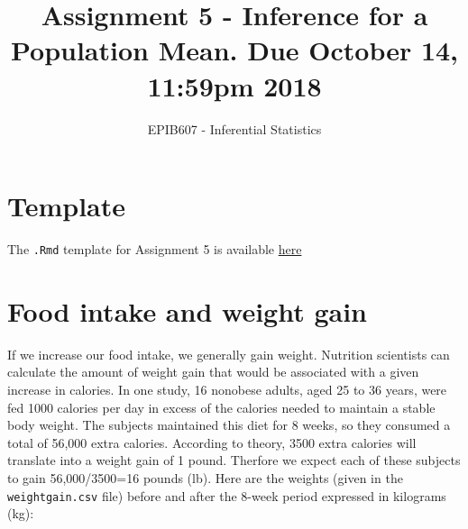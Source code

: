 \documentclass[letterpaper,9pt,twoside,printwatermark=false]{pinp}
\title{Assignment 5 - Inference for a Population Mean. Due October 14, 11:59pm
2018}
\author[a]{EPIB607 - Inferential Statistics}
\affil[a]{Fall 2018, McGill University}
\begin{document}
\verticaladjustment{-2pt}

\maketitle
\thispagestyle{firststyle}



\section*{Template}\label{template}

The \texttt{.Rmd} template for Assignment 5 is available
\href{https://github.com/sahirbhatnagar/EPIB607/raw/master/assignments/a5/a5_template.Rmd}{here}

\section{Food intake and weight gain}\label{food-intake-and-weight-gain}

If we increase our food intake, we generally gain weight. Nutrition
scientists can calculate the amount of weight gain that would be
associated with a given increase in calories. In one study, 16 nonobese
adults, aged 25 to 36 years, were fed 1000 calories per day in excess of
the calories needed to maintain a stable body weight. The subjects
maintained this diet for 8 weeks, so they consumed a total of 56,000
extra calories. According to theory, 3500 extra calories will translate
into a weight gain of 1 pound. Therfore we expect each of these subjects
to gain 56,000/3500=16 pounds (lb). Here are the weights (given in the
\texttt{weightgain.csv} file) before and after the 8-week period
expressed in kilograms (kg):

\begin{Shaded}
\begin{Highlighting}[]
\StringTok{ }\NormalTok{(}\NormalTok{)}
\end{Highlighting}
\end{Shaded}
\end{document}
